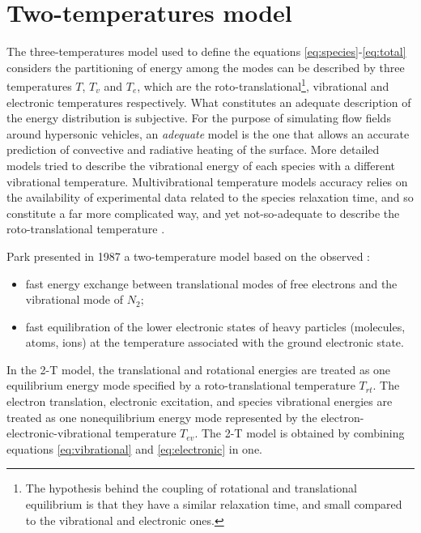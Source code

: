 \documentclass[11pt,a4paper,twocolumn]{article}
\begin{document}
\section{Two-temperatures model}
The three-temperatures model used to define the equations \ref{eq:species}-\ref{eq:total} considers the partitioning of energy among the modes can be described by three temperatures $T$, $T_v$ and $T_e$, which are the roto-translational\footnote{The hypothesis behind the coupling of rotational and translational equilibrium is that they have a similar relaxation time, and small compared to the vibrational and electronic ones.}, vibrational and electronic temperatures respectively. What constitutes an adequate description of the energy distribution is subjective. For the purpose of simulating flow fields around hypersonic vehicles, an \textit{adequate} model is the one that allows an accurate prediction of convective and radiative heating of the surface. More detailed models tried to describe the vibrational energy of each species with a different vibrational temperature. Multivibrational temperature models accuracy relies on the availability of experimental data related to the species relaxation time, and so constitute a far more complicated way, and yet not-so-adequate to describe the roto-translational temperature \cite{gnoffo1989conservation}. 

Park presented in 1987 a two-temperature model based on the observed \cite{park1988assessment}:
\begin{itemize}
    \item fast energy exchange between translational modes of free electrons and the vibrational mode of $N_2$;
    \item fast equilibration of the lower electronic states of heavy particles (molecules, atoms, ions) at the temperature associated with the ground electronic state.
\end{itemize}
In the 2-T model, the translational and rotational energies are treated as one equilibrium energy mode specified by a roto-translational temperature $T_{rt}$. The electron translation, electronic excitation, and species vibrational energies are treated as one nonequilibrium energy mode represented by the electron-electronic-vibrational temperature $T_{ev}$. The 2-T model is obtained by combining equations \ref{eq:vibrational} and \ref{eq:electronic} in one.\\
\end{document}

